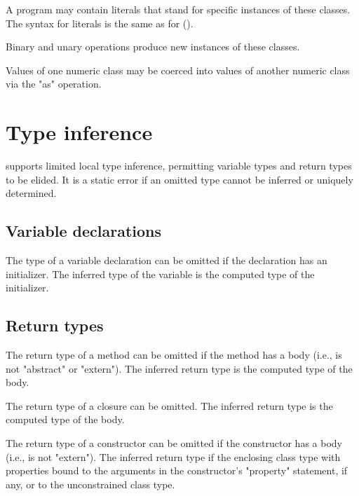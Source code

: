 A program may contain literals
that stand for specific instances of these classes. The syntax
for literals is the same as for \java{} ().

Binary and unary operations produce new instances of these
classes.

Values of one numeric class may be coerced into values of
another numeric class via the \xcd"as" operation.





\section{Type inference}
\label{TypeInference}

\XtenCurrVer{} supports limited local type inference, permitting
variable types and return types to be elided.
It is a static error if an omitted type cannot be inferred or
uniquely determined.

\subsection{Variable declarations}

The type of a variable declaration can be omitted if the
declaration has an initializer.  The inferred type of the
variable is the computed type of the initializer.

\subsection{Return types}

The return type of a method can be omitted if the method has a
body (i.e., is not \xcd"abstract" or \xcd"extern").  The
inferred return type is the computed type of the body.

The return type of a closure can be omitted.
The inferred return type is the computed type of the body.

The return type of a constructor can be omitted if the
constructor has a body (i.e., is not \xcd"extern").
The inferred return type if the enclosing class type with
properties bound to the arguments in the constructor's \xcd"property"
statement, if any, or to the unconstrained class type.

